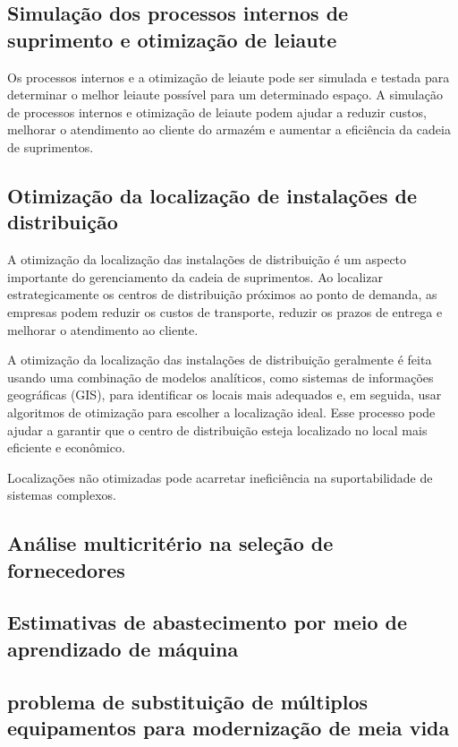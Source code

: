 \documentclass{article}
\begin{document}
\subsection{Simulação dos processos internos de suprimento e otimização de leiaute}

Os processos internos e a otimização de leiaute pode ser simulada e testada para determinar o melhor leiaute possível para um determinado espaço.
A simulação de processos internos e otimização de leiaute podem ajudar a reduzir custos, melhorar o atendimento ao cliente do armazém e aumentar a eficiência da cadeia de suprimentos.

\subsection{Otimização da localização de instalações de distribuição}

A otimização da localização das instalações de distribuição é um aspecto importante do gerenciamento da cadeia de suprimentos. Ao localizar estrategicamente os centros de distribuição próximos ao ponto de demanda, as empresas podem reduzir os custos de transporte, reduzir os prazos de entrega e melhorar o atendimento ao cliente.

A otimização da localização das instalações de distribuição geralmente é feita usando uma combinação de modelos analíticos, como sistemas de informações geográficas (GIS), para identificar os locais mais adequados e, em seguida, usar algoritmos de otimização para escolher a localização ideal. Esse processo pode ajudar a garantir que o centro de distribuição esteja localizado no local mais eficiente e econômico.

Localizações não otimizadas pode acarretar ineficiência na suportabilidade de sistemas complexos.

\subsection{Análise multicritério na seleção de fornecedores}



\subsection{Estimativas de abastecimento por meio de aprendizado de máquina}

\subsection{problema de substituição de múltiplos equipamentos para modernização de meia vida}
\end{document}
